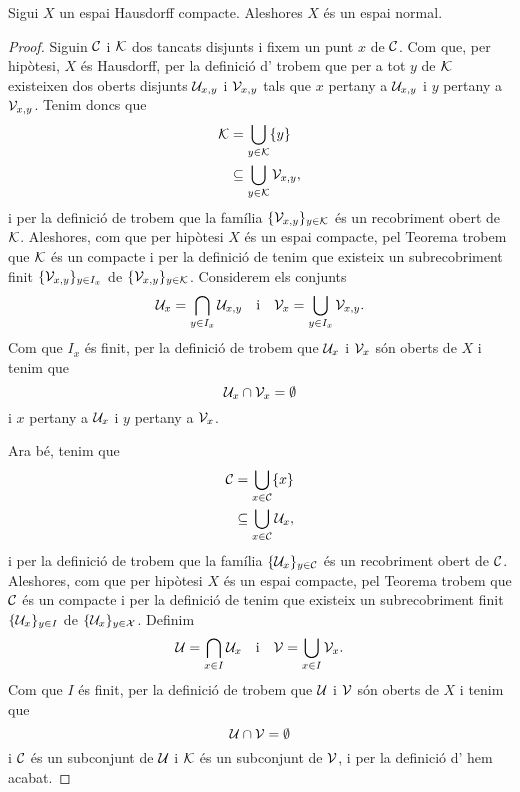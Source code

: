 \documentclass[../Apunts.tex]{subfiles}
\begin{document}
	\begin{theorem}
		\label{thm:els espais Hausdorff compactes són espais normals}
		Sigui \(X\) un espai Hausdorff compacte. Aleshores \(X\) és un espai normal.
		\begin{proof} %
			Siguin \(\mathcal{C}\) i \(\mathcal{K}\) dos tancats disjunts i fixem un punt \(x\) de \(\mathcal{C}\). Com que, per hipòtesi, \(X\) és Hausdorff, per la definició d' trobem que per a tot \(y\) de \(\mathcal{K}\) existeixen dos oberts disjunts \(\mathcal{U}_{x,y}\) i \(\mathcal{V}_{x,y}\) tals que \(x\) pertany a \(\mathcal{U}_{x,y}\) i \(y\) pertany a \(\mathcal{V}_{x,y}\). Tenim doncs que
			\begin{align*}
				\mathcal{K}&=\bigcup_{y\in\mathcal{K}}\{y\} \\
				&\subseteq\bigcup_{y\in\mathcal{K}}\mathcal{V}_{x,y},
			\end{align*}
			i per la definició de  trobem que la família \(\{\mathcal{V}_{x,y}\}_{y\in\mathcal{K}}\) és un recobriment obert de \(\mathcal{K}\). Aleshores, com que per hipòtesi \(X\) és un espai compacte, pel Teorema  trobem que \(\mathcal{K}\) és un compacte i per la definició de  tenim que existeix un subrecobriment finit \(\{\mathcal{V}_{x,y}\}_{y\in I_{x}}\) de \(\{\mathcal{V}_{x,y}\}_{y\in\mathcal{K}}\). Considerem els conjunts
			\[\mathcal{U}_{x}=\bigcap_{y\in I_{x}}\mathcal{U}_{x,y}\quad\text{i}\quad\mathcal{V}_{x}=\bigcup_{y\in I_{x}}\mathcal{V}_{x,y}.\]
			Com que \(I_{x}\) és finit, per la definició de  trobem que \(\mathcal{U}_{x}\) i \(\mathcal{V}_{x}\) són oberts de \(X\) i tenim que
			\[\mathcal{U}_{x}\cap\mathcal{V}_{x}=\emptyset\]
			i \(x\) pertany a \(\mathcal{U}_{x}\) i \(y\) pertany a \(\mathcal{V}_{x}\).
			
			Ara bé, tenim que
			\begin{align*}
				\mathcal{C}&=\bigcup_{x\in\mathcal{C}}\{x\} \\
				&\subseteq\bigcup_{x\in\mathcal{C}}\mathcal{U}_{x},
			\end{align*}
			i per la definició de  trobem que la família \(\{\mathcal{U}_{x}\}_{y\in\mathcal{C}}\) és un recobriment obert de \(\mathcal{C}\). Aleshores, com que per hipòtesi \(X\) és un espai compacte, pel Teorema  trobem que \(\mathcal{C}\) és un compacte i per la definició de  tenim que existeix un subrecobriment finit \(\{\mathcal{U}_{x}\}_{y\in I}\) de \(\{\mathcal{U}_{x}\}_{y\in\mathcal{X}}\). Definim
			\[\mathcal{U}=\bigcap_{x\in I}\mathcal{U}_{x}\quad\text{i}\quad\mathcal{V}=\bigcup_{x\in I}\mathcal{V}_{x}.\]
			Com que \(I\) és finit, per la definició de  trobem que \(\mathcal{U}\) i \(\mathcal{V}\) són oberts de \(X\) i tenim que
			\[\mathcal{U}\cap\mathcal{V}=\emptyset\]
			i \(\mathcal{C}\) és un subconjunt de \(\mathcal{U}\) i \(\mathcal{K}\) és un subconjunt de \(\mathcal{V}\), i per la definició d' hem acabat.
		\end{proof}
	\end{theorem}
\end{document}
